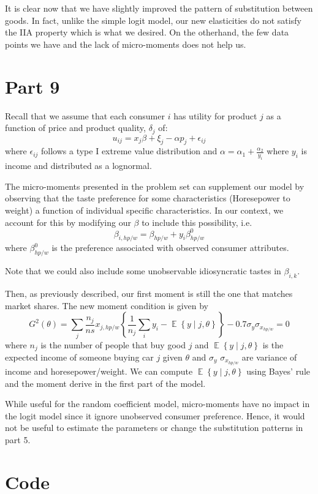 \documentclass[12pt]{article}
\newcommand{\1}{{\bf 1}} %
\DeclareMathOperator{\E}{\mathbb{E}} %
\newcommand{\Ex}[1]{\E\left\{#1\right\}} %
\newcommand{\cbra}[1]{\left\{ #1 \right\}}
\begin{document}
It is clear now that we have slightly improved the pattern of substitution between goods. In fact, unlike the simple logit model, our new elasticities do not satisfy the IIA property which is what we desired. On the otherhand, the few data points we have and the lack of micro-moments does not help us.


\section*{Part 9}

Recall that we assume that each consumer $i$ has utility for product $j$ as a function of price and product quality, $\delta_j$ of:
\[
u_{ij} = x_j\beta +\xi_j -\alpha p_j+\epsilon_{ij}
\]
where $\epsilon_{ij}$ follows a type I extreme value distribution and $\alpha = \alpha_1 + \frac{\alpha_2}{y_i}$ where $y_i$ is income and distributed as a lognormal.

The micro-moments presented in the problem set can supplement our model by observing that the taste preference for some characteristics (Horesepower to weight) a function of individual specific characteristics. In our context, we account for this by modifying our $\beta$ to include this possibility, i.e.
\[
\beta_{i,hp/w} = \beta_{hp/w} + y_{i}\beta_{hp/w}^0
\]
where $\beta_{hp/w}^0$ is the preference associated with observed consumer attributes.

Note that we could also include some unobservable idiosyncratic tastes in $\beta_{i,k}$.

Then, as previously described, our first moment is still the one that matches market shares. The new moment condition is given by
\[
G^2(\theta) = \sum_j \frac{n_j}{ns} x_{j,hp/w} \cbra{ \frac{1}{n_j}\sum_i y_i - \Ex{y \mid j , \theta} } - 0.7 \sigma_y \sigma_{x_{hp/w}} = 0
\]
where $n_j$ is the number of people that buy good $j$ and $\Ex{y \mid j , \theta}$ is the expected income of someone buying car $j$ given $\theta$ and $\sigma_y$ $\sigma_{x_{hp/w}}$ are variance of income and horesepower/weight. We can compute $\Ex{y \mid j , \theta}$ using Bayes' rule and the moment derive in the first part of the model.

While useful for the random coefficient model, micro-moments have no impact in the logit model since it ignore unobserved consumer preference. Hence, it would not be useful to estimate the parameters or change the substitution patterns in part 5.


\section*{Code}
\singlespace
\end{document}
